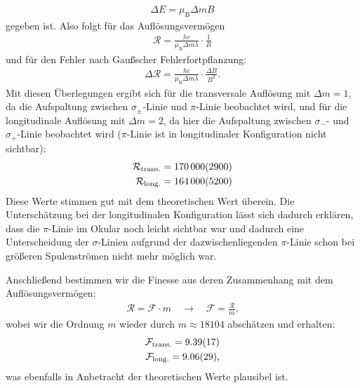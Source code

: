 \documentclass[11pt, a4paper]{article}
\begin{document}
\begin{align*}
	\Delta E = \mu_\mathrm{B} \Delta m B
\end{align*}
gegeben ist.
Also folgt für das Auflösungsvermögen
\begin{align*}
	\mathcal{R} = \frac{h c}{ \mu_\mathrm{B} \Delta m \lambda} \cdot \frac{1}{B} 
\end{align*}
und für den Fehler nach Gaußscher Fehlerfortpflanzung:
\begin{align*}
	\Delta \mathcal{R} = \frac{h c}{ \mu_\mathrm{B} \Delta m \lambda} \cdot \frac{\Delta B}{B^2} \text{.}
\end{align*}
Mit diesen Überlegungen ergibt sich für die transversale Auflösung mit $\Delta m = 1$, da die Aufspaltung zwischen $\sigma_\pm$-Linie und $\pi$-Linie beobachtet wird, und für die longitudinale Auflösung mit $\Delta m = 2$, da hier die Aufspaltung zwischen $\sigma_-$- und $\sigma_+$-Linie beobachtet wird ($\pi$-Linie ist in longitudinaler Konfiguration nicht sichtbar):
\begin{align*}
	\mathcal{R}_\mathrm{trans.} = \num{170000 +- 2900} \\
	\mathcal{R}_\mathrm{long.} =\num{164000 +- 5200}
\end{align*}
Diese Werte stimmen gut mit dem theoretischen Wert überein.
Die Unterschätzung bei der longitudinalen Konfiguration lässt sich dadurch erklären, dass die $\pi$-Linie im Okular noch leicht sichtbar war und dadurch eine Unterscheidung der $\sigma$-Linien aufgrund der dazwischenliegenden $\pi$-Linie schon bei größeren Spulenströmen nicht mehr möglich war.

Anschließend bestimmen wir die Finesse aus deren Zusammenhang mit dem Auflösungsvermögen:
\begin{align*}
\mathcal{R} = \mathcal{F} \cdot m \quad \rightarrow \quad \mathcal{F} = \frac{\mathcal{R}}{m}\text{,}                    
\end{align*}
wobei wir die Ordnung $m$ wieder durch $m \approx \num{18104}$ abschätzen und erhalten:
\begin{align*}
	\mathcal{F}_\mathrm{trans.} = \num{9.39 +- 0.17} \\
	\mathcal{F}_\mathrm{long.} = \num{9.06  +- 0.29}\text{,}
\end{align*}
was ebenfalls in Anbetracht der theoretischen Werte plausibel ist.
\end{document}
